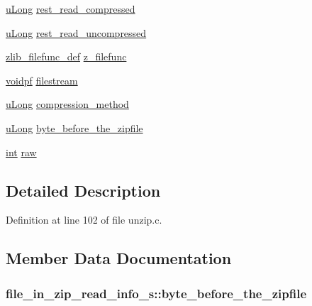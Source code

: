 \begin{DoxyCompactItemize}
\hyperlink{zconf_8h_a154b3b80120c903a368fec5f11f3007a}{u\-Long} \hyperlink{structfile__in__zip__read__info__s_a4c7b8e6502f7195feefd676dff0bb494}{rest\-\_\-read\-\_\-compressed}
\item 
\hyperlink{zconf_8h_a154b3b80120c903a368fec5f11f3007a}{u\-Long} \hyperlink{structfile__in__zip__read__info__s_a8e3801645cfa5bfd147fd8d037fcf9a5}{rest\-\_\-read\-\_\-uncompressed}
\item 
\hyperlink{ioapi_8h_a269f2bded66a7ee4052a60025afebd7e}{zlib\-\_\-filefunc\-\_\-def} \hyperlink{structfile__in__zip__read__info__s_a5eae7e8fffe8d7e9e7271ce2206283e7}{z\-\_\-filefunc}
\item 
\hyperlink{zconf_8h_aa0944432a046192e6602e13ec126acaa}{voidpf} \hyperlink{structfile__in__zip__read__info__s_ab0b66746406599abe4528b7b48961bba}{filestream}
\item 
\hyperlink{zconf_8h_a154b3b80120c903a368fec5f11f3007a}{u\-Long} \hyperlink{structfile__in__zip__read__info__s_a86cbaa96568192cae9ab9cd606963fdb}{compression\-\_\-method}
\item 
\hyperlink{zconf_8h_a154b3b80120c903a368fec5f11f3007a}{u\-Long} \hyperlink{structfile__in__zip__read__info__s_a52c8e657a1238a3b9fa87b4167d9b7a3}{byte\-\_\-before\-\_\-the\-\_\-zipfile}
\item 
\hyperlink{ioapi_8h_a787fa3cf048117ba7123753c1e74fcd6}{int} \hyperlink{structfile__in__zip__read__info__s_aec0649000ce059ef1262b5a5be1641fe}{raw}
\end{DoxyCompactItemize}


\subsection{Detailed Description}


Definition at line 102 of file unzip.\-c.



\subsection{Member Data Documentation}
\hypertarget{structfile__in__zip__read__info__s_a52c8e657a1238a3b9fa87b4167d9b7a3}{
\subsubsection[{byte\-\_\-before\-\_\-the\-\_\-zipfile}]{ file\-\_\-in\-\_\-zip\-\_\-read\-\_\-info\-\_\-s\-::byte\-\_\-before\-\_\-the\-\_\-zipfile}}\label{structfile__in__zip__read__info__s_a52c8e657a1238a3b9fa87b4167d9b7a3}



